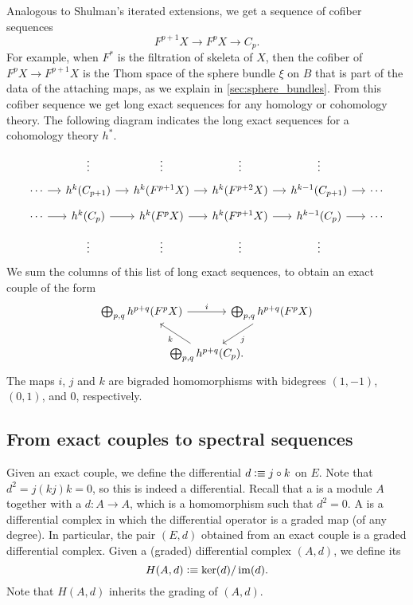 \documentclass[reqno]{amsart}
\begin{document}
Analogous to Shulman's iterated extensions, we get a sequence of cofiber sequences
\begin{equation*}
F^{p+1}X\to F^pX \to C_p.
\end{equation*}
For example, when $F^\ast$ is the filtration of skeleta of $X$, then the cofiber
of $F^pX\to F^{p+1}X$ is the Thom space of the sphere bundle $\xi$ on $B$ that
is part of the data of the attaching maps, as we explain in \autoref{sec:sphere_bundles}.
From this cofiber sequence we get long exact sequences for any homology or cohomology theory. The following
diagram indicates the long exact sequences for a cohomology theory $h^\ast$.
\begin{equation*}
\begin{tikzcd}[row sep=tiny,column sep=small]
& \vdots & \vdots & \vdots & \vdots \\
\cdots \arrow[r] & h^k(C_{p+1}) \arrow[r] & h^k(F^{p+1}X) \arrow[r] & h^k(F^{p+2}X) \arrow[r] & h^{k-1}(C_{p+1}) \arrow[r] & \cdots \\
\cdots \arrow[r] & h^k(C_p) \arrow[r] & h^k(F^pX) \arrow[r] & h^k(F^{p+1}X) \arrow[r] & h^{k-1}(C_p) \arrow[r] & \cdots \\
& \vdots & \vdots & \vdots & \vdots
\end{tikzcd}
\end{equation*}
We sum the columns of this list of long exact sequences, to obtain an exact couple of the form
\begin{equation*}
\begin{tikzcd}[column sep=-2em]
\bigoplus_{p,q}h^{p+q}(F^pX) \arrow[rr,"i"] & & \bigoplus_{p,q}h^{p+q}(F^pX) \arrow[dl,"j"] \\
& \bigoplus_{p,q}h^{p+q}(C_p). \arrow[ul,"k"]
\end{tikzcd}
\end{equation*}
The maps $i$, $j$ and $k$ are bigraded homomorphisms with bidegrees $(1,-1)$, $(0,1)$, and $0$, respectively.

\subsection{From exact couples to spectral sequences}
Given an exact couple, we define the differential $d\vcentcolon\equiv j\circ k$ on
$E$. Note that $d^2=j(kj)k=0$, so this is indeed a differential. 
Recall that a  is a module $A$ together with a  $d:A\to A$, which is a homomorphism such that $d^2=0$. A  is a differential complex in which the differential operator is a graded map (of any degree). In particular, the pair $(E,d)$ obtained from an exact couple is a graded differential complex.
Given a (graded) differential complex $(A,d)$, we define its 
\begin{equation*}
H(A,d)\vcentcolon\equiv\ker(d)/\operatorname{im}(d).
\end{equation*}
Note that $H(A,d)$ inherits the grading of $(A,d)$.
\end{document}
